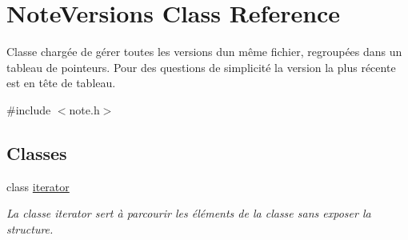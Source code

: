 \hypertarget{classNoteVersions}{}\section{Note\+Versions Class Reference}
\label{classNoteVersions}


Classe chargée de gérer toutes les versions d\textquotesingle{}un même fichier, regroupées dans un tableau de pointeurs. Pour des questions de simplicité la version la plus récente est en tête de tableau.  




{\ttfamily \#include $<$note.\+h$>$}

\subsection*{Classes}
\begin{DoxyCompactItemize}
\item 
class \hyperlink{classNoteVersions_1_1iterator}{iterator}
\begin{DoxyCompactList}\small\item\em La classe iterator sert à parcourir les éléments de la classe sans exposer la structure. \end{DoxyCompactList}\end{DoxyCompactItemize}
